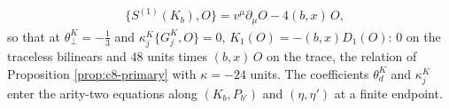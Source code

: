 \begin{proposition}
\begin{itemize}
\[\begin{aligned}
&\{S^{(1)}(K_b),O\}=v^\mu\partial_\mu O-4(b,x)\,O,
\end{aligned}
\]
so that at $\theta^K_\perp=-\tfrac13$ and $\kappa^K_j\{G^K_j,O\}=0$, $K_1(O)=-(b,x)D_1(O)$: $0$ on the traceless bilinears and $48$ units times $(b,x)\,O$ on the trace, the relation of Proposition \ref{prop:c8-primary} with $\kappa=-24$ units. The coefficients $\theta^K_d$ and $\kappa^K_j$ enter the arity-two equations along $(K_b,P_{b'})$ and $(\eta,\eta')$ at a finite endpoint.
\end{itemize}
\end{proposition}
